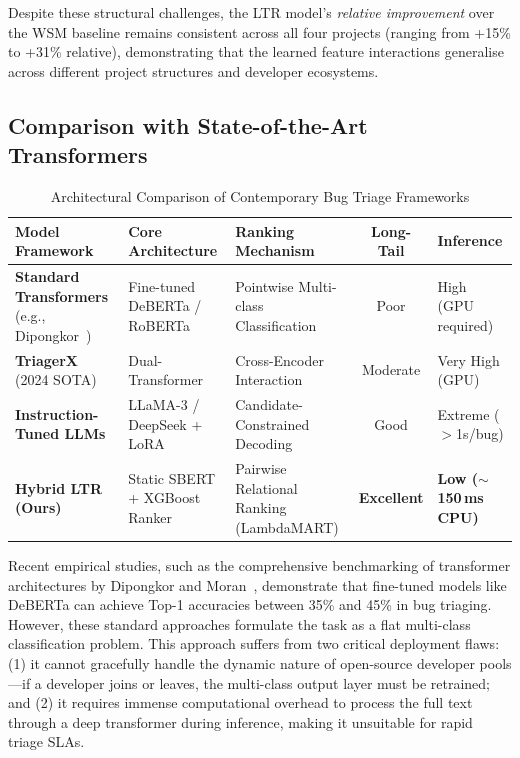 \documentclass[sigconf,review,anonymous]{acmart}
\begin{document}
Despite these structural challenges, the LTR model's \emph{relative
improvement} over the WSM baseline remains consistent across all four
projects (ranging from +15\% to +31\% relative), demonstrating that the
learned feature interactions generalise across different project structures
and developer ecosystems.

\subsection{Comparison with State-of-the-Art Transformers}

\begin{table}[t]
\centering
\caption{Architectural Comparison of Contemporary Bug Triage Frameworks}
\label{tab:sota_comparison}
\renewcommand{\arraystretch}{1.3}
\begin{tabular}{@{}p{3.5cm} p{4.5cm} p{4.5cm} c p{2.5cm}@{}}
\toprule
\textbf{Model Framework} & \textbf{Core Architecture} & \textbf{Ranking Mechanism} & \textbf{Long-Tail} & \textbf{Inference} \\
\midrule
\textbf{Standard Transformers} (e.g., Dipongkor~\cite{dipongkor2023transformer}) & Fine-tuned DeBERTa / RoBERTa & Pointwise Multi-class Classification & Poor & High (GPU required) \\
\textbf{TriagerX} (2024 SOTA) & Dual-Transformer & Cross-Encoder Interaction & Moderate & Very High (GPU) \\
\textbf{Instruction-Tuned LLMs} & LLaMA-3 / DeepSeek + LoRA & Candidate-Constrained Decoding & Good & Extreme ($>$1s/bug) \\
\textbf{Hybrid LTR (Ours)} & Static SBERT + XGBoost Ranker & Pairwise Relational Ranking (LambdaMART) & \textbf{Excellent} & \textbf{Low ($\sim$150\,ms CPU)} \\
\bottomrule
\end{tabular}
\end{table}

Recent empirical studies, such as the comprehensive benchmarking of transformer architectures by Dipongkor and Moran~\cite{dipongkor2023transformer}, demonstrate that fine-tuned models like DeBERTa can achieve Top-1 accuracies between 35\% and 45\% in bug triaging. However, these standard approaches formulate the task as a flat multi-class classification problem. This approach suffers from two critical deployment flaws: (1) it cannot gracefully handle the dynamic nature of open-source developer pools---if a developer joins or leaves, the multi-class output layer must be retrained; and (2) it requires immense computational overhead to process the full text through a deep transformer during inference, making it unsuitable for rapid triage SLAs.
\end{document}
